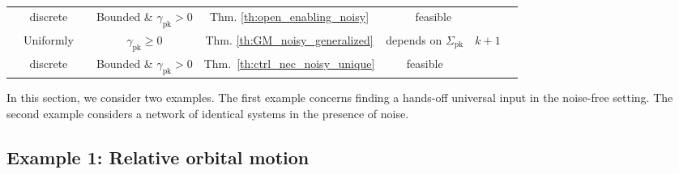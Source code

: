 \documentclass[journal,twoside,web]{ieeecolor}
\begin{document}
\begin{table}[h]
\begin{tabular}{|c|c|c|c|c|c|c|c|c|c|}
            &  discrete &  & \multicolumn{2}{c|}{Bounded \& $\gamma_\text{pk}>0$} & Thm. \ref{th:open_enabling_noisy} &  & feasible &  \\ 
            \cline{2-2}\cline{4-7}\cline{8-9}
           & Uniformly &  & \multicolumn{2}{c|}{$\gamma_\text{pk}\geq0$} & Thm. \ref{th:GM_noisy_generalized} & \multicolumn{2}{c|}{depends on $\Sigma_\text{pk}$} & \multirow{2}{*}{$k+1$} \\ \cline{4-8}
           & discrete & & \multicolumn{2}{c|}{Bounded \& $\gamma_\text{pk}>0$} & Thm.~\ref{th:ctrl_nec_noisy_unique} & \multicolumn{2}{c|}{feasible} & \\
           \hline
    \end{tabular}
\end{table}

In this section, we consider two examples. The first example concerns finding a hands-off universal input in the noise-free setting. The second example considers a network of identical systems in the presence of noise. 

\subsection{Example 1: Relative orbital motion}
\label{subsec:ex1}
\end{document}
